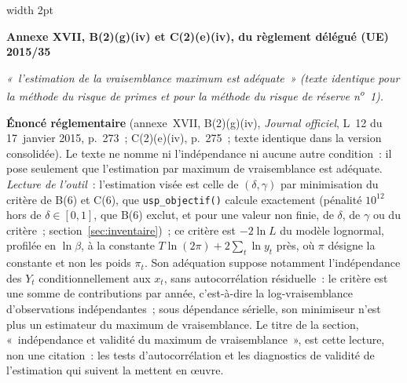 \documentclass[a4paper,11pt]{article}
\newcommand{\code}[1]{\texttt{\small #1}}
\newcommand{\reglement}[2]{%
  \par\vspace{2mm}\noindent\begin{minipage}{\linewidth}
  \small\setlength{\parindent}{0pt}
  \textcolor{financeblue}{\vrule width 2pt}\hspace{4mm}%
  \begin{minipage}{\dimexpr\linewidth-7mm\relax}
  \textcolor{financeblue}{\textbf{#1}}
  \par\vspace{2pt}
  {\itshape #2}
  \end{minipage}
  \end{minipage}\par\vspace{3mm}}
\begin{document}
\reglement{Annexe XVII, B(2)(g)(iv) et C(2)(e)(iv), du règlement délégué (UE) 2015/35}{«~l'estimation
de la vraisemblance maximum est adéquate~» (texte identique pour la méthode du risque de primes
et pour la méthode du risque de réserve n\textsuperscript{o}~1).}

\begin{encadre}
\textbf{Énoncé réglementaire} (annexe~XVII, B(2)(g)(iv), \emph{Journal officiel}, L~12 du
17~janvier 2015, p.~273~; C(2)(e)(iv), p.~275~; texte identique dans la version consolidée). Le
texte ne nomme ni l'indépendance ni aucune autre condition~: il pose seulement que l'estimation
par maximum de vraisemblance est adéquate. \emph{Lecture de l'outil}~: l'estimation visée est
celle de $(\delta, \gamma)$ par minimisation du critère de B(6) et C(6), que
\code{usp\_objectif()} calcule exactement (pénalité $10^{12}$ hors de $\delta \in [0,1]$, que B(6)
exclut, et pour une valeur non finie, de $\delta$, de $\gamma$ ou du critère~;
section~\ref{sec:inventaire})~; ce critère est $-2\ln L$ du modèle lognormal, profilée en
$\ln\beta$, à la constante $T\ln(2\pi) + 2\sum_t \ln y_t$ près, où $\pi$ désigne la constante
et non les poids $\pi_t$.
Son adéquation suppose notamment l'indépendance des $Y_t$ conditionnellement aux $x_t$, sans
autocorrélation résiduelle~: le critère est une somme de contributions par année, c'est-à-dire la
log-vraisemblance d'observations indépendantes~; sous dépendance sérielle, son minimiseur n'est
plus un estimateur du maximum de vraisemblance. Le titre de la section, «~indépendance et validité du maximum de
vraisemblance~», est cette lecture, non une citation~: les tests d'autocorrélation et les
diagnostics de validité de l'estimation qui suivent la mettent en œuvre.
\end{encadre}
\end{document}
